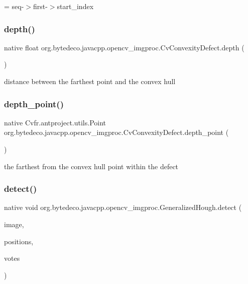 = seq-\/$>$first-\/$>$start\+\_\+index \mbox{\label{group__imgproc_ga8baffaba023fa380d056b4686becfd86}} 
\subsubsection{\texorpdfstring{depth()}{depth()}}
{\footnotesize\ttfamily native float org.\+bytedeco.\+javacpp.\+opencv\+\_\+imgproc.\+Cv\+Convexity\+Defect.\+depth (\begin{DoxyParamCaption}{ }\end{DoxyParamCaption})}

distance between the farthest point and the convex hull \mbox{\label{group__imgproc_ga7de5f58f386b3cf8bef96739d89a24cb}} 
\subsubsection{\texorpdfstring{depth\+\_\+point()}{depth\_point()}}
{\footnotesize\ttfamily native Cv\+fr.antproject.utils.Point org.\+bytedeco.\+javacpp.\+opencv\+\_\+imgproc.\+Cv\+Convexity\+Defect.\+depth\+\_\+point (\begin{DoxyParamCaption}{ }\end{DoxyParamCaption})}

the farthest from the convex hull point within the defect \mbox{\label{group__imgproc_ga85f8c877156761def90adf12f47cf2d7}} 
\subsubsection{\texorpdfstring{detect()}{detect()}\hspace{0.1cm}{\footnotesize\ttfamily [1/2]}}
{\footnotesize\ttfamily native void org.\+bytedeco.\+javacpp.\+opencv\+\_\+imgproc.\+Generalized\+Hough.\+detect (\begin{DoxyParamCaption}\item[{@By\+Val Mat}]{image,  }\item[{@By\+Val Mat}]{positions,  }\item[{@By\+Val(null\+Value=\char`\"{}cv\+::\+Output\+Array(cv\+::no\+Array())\char`\"{}) Mat}]{votes }\end{DoxyParamCaption})}

